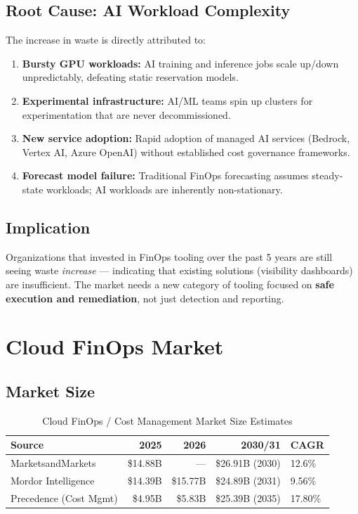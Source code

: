 \documentclass[a4paper,11pt]{article}
\begin{document}
\subsection{Root Cause: AI Workload Complexity}

The increase in waste is directly attributed to:
\begin{enumerate}[itemsep=1mm]
    \item \textbf{Bursty GPU workloads:} AI training and inference jobs scale up/down unpredictably, defeating static reservation models.
    \item \textbf{Experimental infrastructure:} AI/ML teams spin up clusters for experimentation that are never decommissioned.
    \item \textbf{New service adoption:} Rapid adoption of managed AI services (Bedrock, Vertex AI, Azure OpenAI) without established cost governance frameworks.
    \item \textbf{Forecast model failure:} Traditional FinOps forecasting assumes steady-state workloads; AI workloads are inherently non-stationary.
\end{enumerate}

\subsection{Implication}

Organizations that invested in FinOps tooling over the past 5 years are still seeing waste \textit{increase} --- indicating that existing solutions (visibility dashboards) are insufficient. The market needs a new category of tooling focused on \textbf{safe execution and remediation}, not just detection and reporting.

\section{Cloud FinOps Market}

\subsection{Market Size}

\begin{table}[H]
\centering
\begin{tabularx}{\textwidth}{Xrrrl}
\toprule
\textbf{Source} & \textbf{2025} & \textbf{2026} & \textbf{2030/31} & \textbf{CAGR} \\
\midrule
MarketsandMarkets & \$14.88B & --- & \$26.91B (2030) & 12.6\% \\
Mordor Intelligence & \$14.39B & \$15.77B & \$24.89B (2031) & 9.56\% \\
Precedence (Cost Mgmt) & \$4.95B & \$5.83B & \$25.39B (2035) & 17.80\% \\
\bottomrule
\end{tabularx}
\caption{Cloud FinOps / Cost Management Market Size Estimates}
\end{table}
\end{document}
